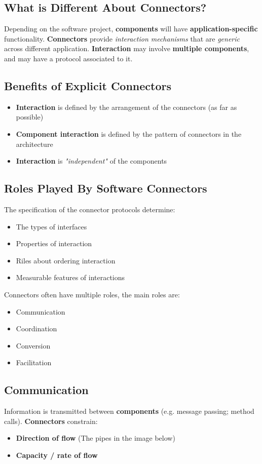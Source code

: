 \documentclass[a4paper]{article}
\begin{document}
\subsection{What is Different About Connectors?}
Depending on the software project, \textbf{components} will have \textbf{application-specific} functionality. \textbf{Connectors} provide \textit{interaction mechanisms} that are \textit{generic} across different application. \textbf{Interaction} may involve \textbf{multiple components}, and may have a protocol associated to it.\\

\subsection{Benefits of Explicit Connectors}
\begin{itemize}
\item \textbf{Interaction} is defined by the arrangement of the connectors (as far as possible)
\item \textbf{Component interaction} is defined by the pattern of connectors in the architecture
\item \textbf{Interaction} is \textit{"independent"} of the components
\end{itemize}

\subsection{Roles Played By Software Connectors}
The specification of the connector protocols determine:
\begin{itemize}
\item The types of interfaces
\item Properties of interaction
\item Riles about ordering interaction
\item Measurable features of interactions\\
\end{itemize}

Connectors often have multiple roles, the main roles are:
\begin{itemize}
\item Communication
\item Coordination
\item Conversion
\item Facilitation
\end{itemize}

\subsection{Communication}
Information is transmitted between \textbf{components} (e.g. message passing; method calls). \textbf{Connectors} constrain:
\begin{itemize}
\item \textbf{Direction of flow }(The pipes in the image below)
\item \textbf{Capacity / rate of flow}\\
\end{itemize}
\end{document}
